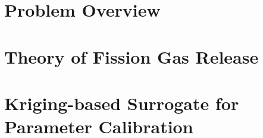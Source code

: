\section{Problem Overview}
\label{sec:problemOverview}


\section{Theory of Fission Gas Release} 
\label{sec:fgrTheory}


\section{Kriging-based Surrogate for Parameter Calibration}
\label{sec:fgrKriging}




